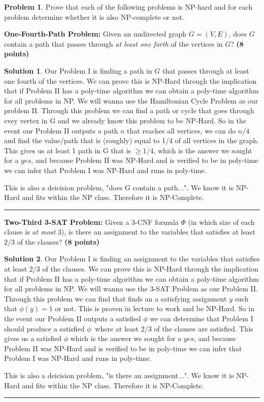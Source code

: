 \documentclass{article}
\theoremstyle{definition}
\newtheorem{problem}{Problem}
\def\fline{\rule{0.75\linewidth}{0.5pt}}
\newcommand{\finishline}{\begin{center}\fline\end{center}}
\newtheorem*{solution*}{Solution}
\newenvironment{solution}{\begin{solution*}}{{\finishline} \end{solution*}}
\newcommand{\grade}[1]{\hfill{\textbf{($\mathbf{#1}$ points)}}}
\begin{document}
\begin{problem}
Prove that each of the following problems is NP-hard and for each problem determine whether it is also NP-complete or not. 

\begin{enumerate}[label=(\alph*)]
	\item \textbf{One-Fourth-Path Problem:} Given an undirected graph $G=(V,E)$, does $G$ contain a path that passes through \emph{at least one forth}  of the vertices in $G$?  \grade{8}

\begin{solution}
	\item Our Problem I is finding a path in $G$ that passes through at least one fourth of the vertices. We can prove this is NP-Hard through the implication that if Problem II has a poly-time algorithm we can obtain a poly-time algorithm for all problems in NP. We will wanna use the Hamiltonian Cycle Problem as our problem II. Through this problem we can find a path or cycle that goes through evey vertex in G and we already know this problem to be NP-Hard. So in the event our Problem II outputs a path $n$ that reaches all vertices, we can do $n/4$ and find the value/path that is (roughly) equal to 1/4 of all vertices in the graph. This gives us at least 1 path in G that is $\geq 1/4$, which is the answer we sought for a $yes$, and because Problem II was NP-Hard and is verified to be in poly-time we can infer that Problem I was NP-Hard and runs in poly-time.
	\item This is also a deicision problem, "does G contain a path...". We know it is NP-Hard and fits within the NP class. Therefore it is NP-Complete. 
\end{solution}

	\item \textbf{Two-Third 3-SAT Problem:} Given a 3-CNF formula $\Phi$ (in which size of each clause is \emph{at most} $3$), is there an assignment to the variables that satisfies at least $2/3$ of the clauses?  \grade{8}

\begin{solution}
	\item Our Problem I is finding an assignment to the variables that satisfies at least 2/3 of the clauses. We can prove this is NP-Hard through the implication that if Problem II has a poly-time algorithm we can obtain a poly-time algorithm for all problems in NP. We will wanna use the 3-SAT Problem as our Problem II. Through this problem we can find that finds an a satisfying assignment $y$ such that $\phi(y) = 1$ or not. This is proven in lecture to work and be NP-Hard. So in the event our Problem II outputs a satisfied $\phi$ we can determine that Problem I should produce a satisfied $\phi\ $ where at least 2/3 of the clauses are satisfied. This gives us a satisfied $\phi $ which is the answer we sought for a $yes$, and because Problem II was NP-Hard and is verified to be in poly-time we can infer that Problem I was NP-Hard and runs in poly-time.
	\item This is also a deicision problem, "is there an assignment...". We know it is NP-Hard and fits within the NP class. Therefore it is NP-Complete.
\end{solution}


\end{enumerate}
\end{problem}
\end{document}
